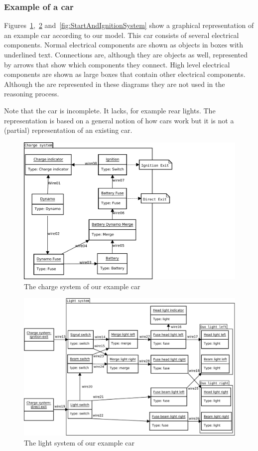 \subsubsection{Example of a car}
Figures~\ref{fig:ChargeSystem},~\ref{fig:LightSystem} and~\ref{fig:StartAndIgnitionSystem} show a graphical representation of an example car according to our model. This car consists of several electrical components. Normal electrical components are shown as objects in boxes with underlined text. Connections are, although they are objects as well, represented by arrows that show which components they connect. High level electrical components are shown as large boxes that contain other electrical components. Although the are represented in these diagrams they are not used in the reasoning process.

Note that the car is incomplete. It lacks, for example rear lights. The representation is based on a general notion of how cars work but it is not a (partial) representation of an existing car.

\begin{figure}[htbp]
	\centering
		\includegraphics[width=1.00\textwidth]{ChargeSystem.pdf}
	\caption{The charge system of our example car}
	\label{fig:ChargeSystem}
\end{figure}

\begin{figure}[htbp]
	\centering
		\includegraphics[width=1.00\textwidth]{LightSystem.pdf}
	\caption{The light system of our example car}
	\label{fig:LightSystem}
\end{figure}

